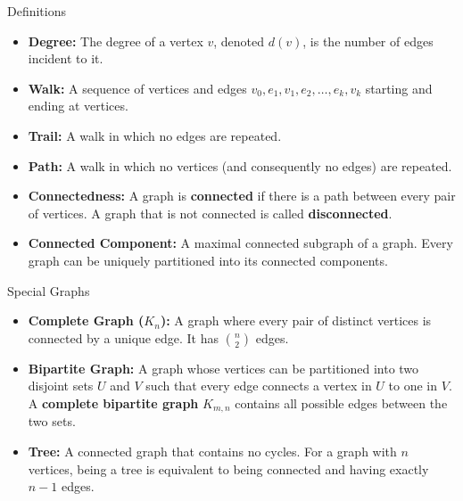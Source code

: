 \documentclass{beamer}
\begin{document}
\begin{frame}{Definitions}
    \begin{itemize}
        \item \textbf{Degree:} The degree of a vertex $v$, denoted $d(v)$, is the number of edges incident to it.
        \item \textbf{Walk:} A sequence of vertices and edges $v_0, e_1, v_1, e_2, \dots, e_k, v_k$ starting and ending at vertices.
        \item \textbf{Trail:} A walk in which no edges are repeated.
        \item \textbf{Path:} A walk in which no vertices (and consequently no edges) are repeated.
        \item \textbf{Connectedness:} A graph is \textbf{connected} if there is a path between every pair of vertices. A graph that is not connected is called \textbf{disconnected}.
        \item \textbf{Connected Component:} A maximal connected subgraph of a graph. Every graph can be uniquely partitioned into its connected components.
    \end{itemize}
\end{frame}

\begin{frame}{Special Graphs}
    \begin{itemize}
        \item \textbf{Complete Graph ($K_n$):} A graph where every pair of distinct vertices is connected by a unique edge. It has $\binom{n}{2}$ edges.
        \item \textbf{Bipartite Graph:} A graph whose vertices can be partitioned into two disjoint sets $U$ and $V$ such that every edge connects a vertex in $U$ to one in $V$. A \textbf{complete bipartite graph} $K_{m,n}$ contains all possible edges between the two sets.
        \item \textbf{Tree:} A connected graph that contains no cycles. For a graph with $n$ vertices, being a tree is equivalent to being connected and having exactly $n-1$ edges.
    \end{itemize}
\end{frame}
\end{document}
